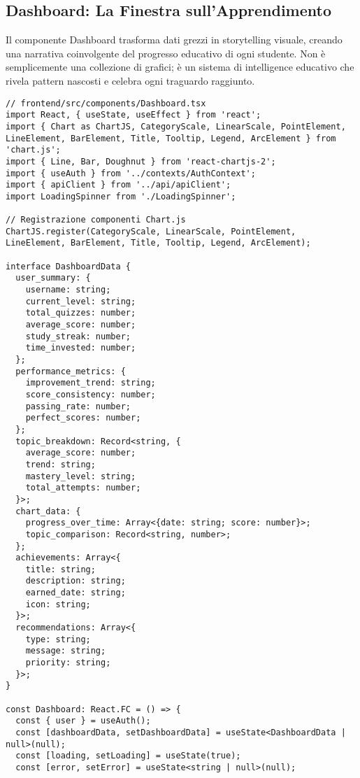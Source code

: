 \documentclass[a4paper, 14pt, oneside]{extbook}
\begin{document}
\subsection{Dashboard: La Finestra sull'Apprendimento}

Il componente Dashboard trasforma dati grezzi in storytelling visuale, creando una narrativa coinvolgente del progresso educativo di ogni studente. Non è semplicemente una collezione di grafici; è un sistema di intelligence educativo che rivela pattern nascosti e celebra ogni traguardo raggiunto.

\begin{lstlisting}[style=javascriptstyle, caption=Dashboard Intelligente con Analytics Avanzate, label=lst:dashboard-component]
// frontend/src/components/Dashboard.tsx
import React, { useState, useEffect } from 'react';
import { Chart as ChartJS, CategoryScale, LinearScale, PointElement, LineElement, BarElement, Title, Tooltip, Legend, ArcElement } from 'chart.js';
import { Line, Bar, Doughnut } from 'react-chartjs-2';
import { useAuth } from '../contexts/AuthContext';
import { apiClient } from '../api/apiClient';
import LoadingSpinner from './LoadingSpinner';

// Registrazione componenti Chart.js
ChartJS.register(CategoryScale, LinearScale, PointElement, LineElement, BarElement, Title, Tooltip, Legend, ArcElement);

interface DashboardData {
  user_summary: {
    username: string;
    current_level: string;
    total_quizzes: number;
    average_score: number;
    study_streak: number;
    time_invested: number;
  };
  performance_metrics: {
    improvement_trend: string;
    score_consistency: number;
    passing_rate: number;
    perfect_scores: number;
  };
  topic_breakdown: Record<string, {
    average_score: number;
    trend: string;
    mastery_level: string;
    total_attempts: number;
  }>;
  chart_data: {
    progress_over_time: Array<{date: string; score: number}>;
    topic_comparison: Record<string, number>;
  };
  achievements: Array<{
    title: string;
    description: string;
    earned_date: string;
    icon: string;
  }>;
  recommendations: Array<{
    type: string;
    message: string;
    priority: string;
  }>;
}

const Dashboard: React.FC = () => {
  const { user } = useAuth();
  const [dashboardData, setDashboardData] = useState<DashboardData | null>(null);
  const [loading, setLoading] = useState(true);
  const [error, setError] = useState<string | null>(null);


\end{lstlisting}
\end{document}
